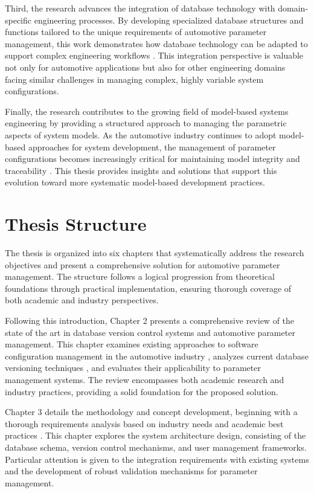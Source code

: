 Third, the research advances the integration of database technology with domain-specific engineering processes. By developing specialized database structures and functions tailored to the unique requirements of automotive parameter management, this work demonstrates how database technology can be adapted to support complex engineering workflows \cite{elmasri2015fundamentals}. This integration perspective is valuable not only for automotive applications but also for other engineering domains facing similar challenges in managing complex, highly variable system configurations.

Finally, the research contributes to the growing field of model-based systems engineering by providing a structured approach to managing the parametric aspects of system models. As the automotive industry continues to adopt model-based approaches for system development, the management of parameter configurations becomes increasingly critical for maintaining model integrity and traceability \cite{staron2021automotive}. This thesis provides insights and solutions that support this evolution toward more systematic model-based development practices.

\section{Thesis Structure}
\label{sec:structure}

The thesis is organized into six chapters that systematically address the research objectives and present a comprehensive solution for automotive parameter management. The structure follows a logical progression from theoretical foundations through practical implementation, ensuring thorough coverage of both academic and industry perspectives.

Following this introduction, Chapter 2 presents a comprehensive review of the state of the art in database version control systems and automotive parameter management. This chapter examines existing approaches to software configuration management in the automotive industry \cite{pretschner2007software}, analyzes current database versioning techniques \cite{bhattacherjee2015principles}, and evaluates their applicability to parameter management systems. The review encompasses both academic research and industry practices, providing a solid foundation for the proposed solution.

Chapter 3 details the methodology and concept development, beginning with a thorough requirements analysis based on industry needs and academic best practices \cite{staron2021automotive}. This chapter explores the system architecture design, consisting of the database schema, version control mechanisms, and user management frameworks. Particular attention is given to the integration requirements with existing systems and the development of robust validation mechanisms for parameter management.

